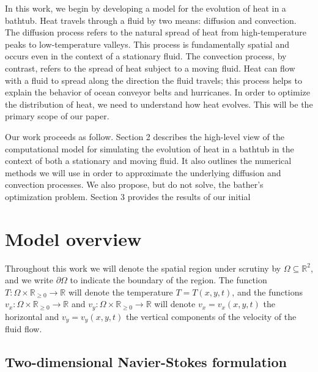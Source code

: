 \documentclass[12pt]{amsart}
\newcommand{\R}{\mathbb{R}}
\begin{document}
In this work, we begin by developing a model for the evolution of heat in a
bathtub. Heat travels through a fluid by two means: diffusion and convection.
The diffusion process refers to the natural spread of heat from high-temperature
peaks to low-temperature valleys. This process is fundamentally spatial and
occurs even in the context of a stationary fluid. The convection process, by
contrast, refers to the spread of heat subject to a moving fluid. Heat can flow
with a fluid to spread along the direction the fluid travels; this process helps
to explain the behavior of ocean conveyor belts and hurricanes. In order to
optimize the distribution of heat, we need to understand how heat evolves. This
will be the primary scope of our paper.

Our work proceeds as follow. Section 2 describes the high-level view of the
computational model for simulating the evolution of heat in a bathtub in the
context of both a stationary and moving fluid. It also outlines the numerical
methods we will use in order to approximate the underlying diffusion and
convection processes. We also propose, but do not solve, the bather's
optimization problem. Section 3 provides the results of our initial 


\section{Model overview}

Throughout this work we will denote the spatial region under scrutiny by
$\Omega \subseteq \R^2$, and we write $\partial \Omega$ to indicate the
boundary of the region. The function $T : \Omega \times \R_{\geq 0} \to \R$
will denote the temperature $T = T(x,y,t)$, and the functions $v_x : \Omega
\times \R_{\geq 0} \to \R$ and $v_y : \Omega \times \R_{\geq 0} \to \R$ will
denote $v_x = v_x(x,y,t)$ the horizontal and $v_y = v_y(x,y,t)$ the vertical
components of the velocity of the fluid flow. 

\subsection{Two-dimensional Navier-Stokes formulation}
\end{document}
